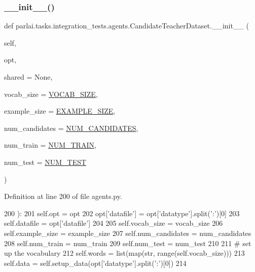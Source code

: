 \subsubsection{\texorpdfstring{\+\_\+\+\_\+init\+\_\+\+\_\+()}{\_\_init\_\_()}}
{\footnotesize\ttfamily def parlai.\+tasks.\+integration\+\_\+tests.\+agents.\+Candidate\+Teacher\+Dataset.\+\_\+\+\_\+init\+\_\+\+\_\+ (\begin{DoxyParamCaption}\item[{}]{self,  }\item[{}]{opt,  }\item[{}]{shared = {\ttfamily None},  }\item[{}]{vocab\+\_\+size = {\ttfamily \hyperlink{namespaceparlai_1_1tasks_1_1integration__tests_1_1agents_a5cd37acf932f9435e0755b6c00c90f65}{V\+O\+C\+A\+B\+\_\+\+S\+I\+ZE}},  }\item[{}]{example\+\_\+size = {\ttfamily \hyperlink{namespaceparlai_1_1tasks_1_1integration__tests_1_1agents_ab401aeabf1a74e6ad6466a5c0b87ac70}{E\+X\+A\+M\+P\+L\+E\+\_\+\+S\+I\+ZE}},  }\item[{}]{num\+\_\+candidates = {\ttfamily \hyperlink{namespaceparlai_1_1tasks_1_1integration__tests_1_1agents_a8fcc41db4eba1091d4ecd3f2b505dc5c}{N\+U\+M\+\_\+\+C\+A\+N\+D\+I\+D\+A\+T\+ES}},  }\item[{}]{num\+\_\+train = {\ttfamily \hyperlink{namespaceparlai_1_1tasks_1_1integration__tests_1_1agents_a48ed2e54c9c2848117b41051e49c2721}{N\+U\+M\+\_\+\+T\+R\+A\+IN}},  }\item[{}]{num\+\_\+test = {\ttfamily \hyperlink{namespaceparlai_1_1tasks_1_1integration__tests_1_1agents_a08ec6b0895f06a6adf9c1f0a45240ad3}{N\+U\+M\+\_\+\+T\+E\+ST}} }\end{DoxyParamCaption})}



Definition at line 200 of file agents.\+py.


\begin{DoxyCode}
200     ):
201         self.opt = opt
202         opt[\textcolor{stringliteral}{'datafile'}] = opt[\textcolor{stringliteral}{'datatype'}].split(\textcolor{stringliteral}{':'})[0]
203         self.datafile = opt[\textcolor{stringliteral}{'datafile'}]
204 
205         self.vocab\_size = vocab\_size
206         self.example\_size = example\_size
207         self.num\_candidates = num\_candidates
208         self.num\_train = num\_train
209         self.num\_test = num\_test
210 
211         \textcolor{comment}{# set up the vocabulary}
212         self.words = list(map(str, range(self.vocab\_size)))
213         self.data = self.setup\_data(opt[\textcolor{stringliteral}{'datatype'}].split(\textcolor{stringliteral}{':'})[0])
214 
\end{DoxyCode}


